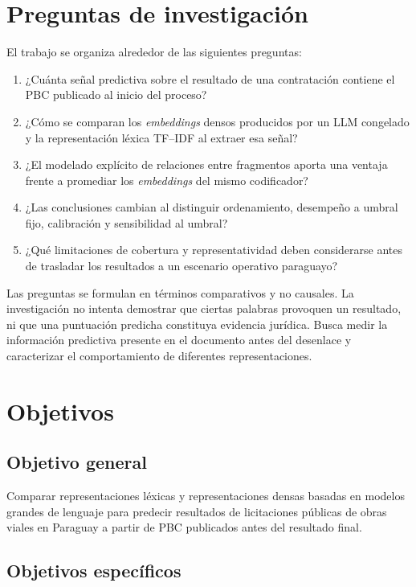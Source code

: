 \section{Preguntas de investigación}

El trabajo se organiza alrededor de las siguientes preguntas:

\begin{enumerate}
  \item ¿Cuánta señal predictiva sobre el resultado de una contratación contiene el PBC publicado al inicio del proceso?
  \item ¿Cómo se comparan los \textit{embeddings} densos producidos por un LLM congelado y la representación léxica TF--IDF al extraer esa señal?
  \item ¿El modelado explícito de relaciones entre fragmentos aporta una ventaja frente a promediar los \textit{embeddings} del mismo codificador?
  \item ¿Las conclusiones cambian al distinguir ordenamiento, desempeño a umbral fijo, calibración y sensibilidad al umbral?
  \item ¿Qué limitaciones de cobertura y representatividad deben considerarse antes de trasladar los resultados a un escenario operativo paraguayo?
\end{enumerate}

Las preguntas se formulan en términos comparativos y no causales. La investigación no intenta demostrar que ciertas palabras provoquen un resultado, ni que una puntuación predicha constituya evidencia jurídica. Busca medir la información predictiva presente en el documento antes del desenlace y caracterizar el comportamiento de diferentes representaciones.

\section{Objetivos}

\subsection{Objetivo general}

Comparar representaciones léxicas y representaciones densas basadas en modelos grandes de lenguaje para predecir resultados de licitaciones públicas de obras viales en Paraguay a partir de PBC publicados antes del resultado final.

\subsection{Objetivos específicos}

